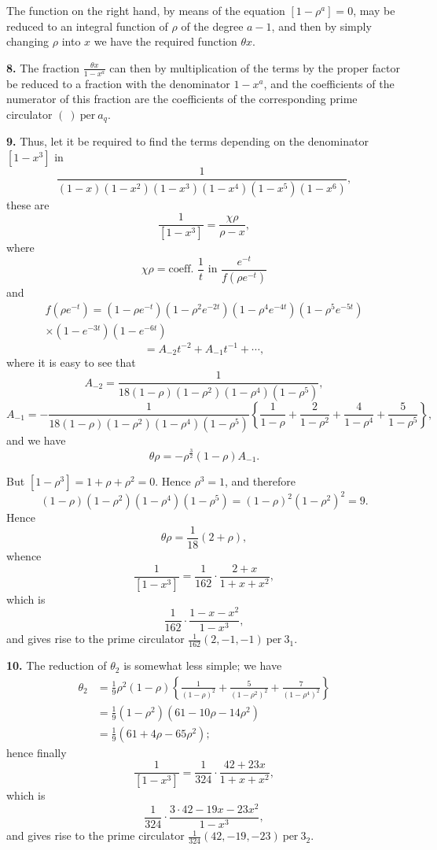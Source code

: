 \documentclass[11pt,a4paper]{book}
\begin{document}
\begin{center}
The function on the right hand, by means of the equation $[1-\rho^a]=0$, may be reduced to an integral function of $\rho$ of the degree $a-1$, and then by simply changing $\rho$ into $x$ we have the required function $\theta x$.

\medskip
\noindent\textbf{8.} The fraction $\frac{\theta x}{1-x^a}$ can then by multiplication of the terms by the proper factor be reduced to a fraction with the denominator $1-x^a$, and the coefficients of the numerator of this fraction are the coefficients of the corresponding prime circulator $(\ )\ \mathrm{per}\ a_q$.

\medskip
\noindent\textbf{9.} Thus, let it be required to find the terms depending on the denominator $[1-x^3]$ in
\[\frac{1}{(1-x)(1-x^2)(1-x^3)(1-x^4)(1-x^5)(1-x^6)},\]
these are
\[\frac{1}{[1-x^3]} = \frac{\chi \rho}{\rho - x},\]
where
\[\chi \rho = \text{coeff. } \frac{1}{t} \text{ in } \frac{e^{-t}}{f(\rho e^{-t})}\]
and
\begin{multline*}
f(\rho e^{-t}) = (1-\rho e^{-t})(1-\rho^2 e^{-2t})(1-\rho^4 e^{-4t})(1-\rho^5 e^{-5t}) \\
\times (1-e^{-3t})(1-e^{-6t})
\end{multline*}
\[= A_{-2}t^{-2} + A_{-1}t^{-1} + \cdots,\]
where it is easy to see that
\[A_{-2} = \frac{1}{18(1-\rho)(1-\rho^2)(1-\rho^4)(1-\rho^5)},\]
\[A_{-1} = -\frac{1}{18(1-\rho)(1-\rho^2)(1-\rho^4)(1-\rho^5)}\left\{\frac{1}{1-\rho}+\frac{2}{1-\rho^2}+\frac{4}{1-\rho^4}+\frac{5}{1-\rho^5}\right\},\]
and we have
\[\theta \rho = -\rho^{\frac{3}{2}}(1-\rho) A_{-1}.\]

But $[1-\rho^3] = 1+\rho+\rho^2 = 0$. Hence $\rho^3=1$, and therefore
\[(1-\rho)(1-\rho^2)(1-\rho^4)(1-\rho^5) = (1-\rho)^2(1-\rho^2)^2 = 9.\]
Hence
\[\theta \rho = \frac{1}{18}(2+\rho),\]
whence
\[\frac{1}{[1-x^3]} = \frac{1}{162} \cdot \frac{2+x}{1+x+x^2},\]
which is
\[\frac{1}{162} \cdot \frac{1-x-x^2}{1-x^3},\]
and gives rise to the prime circulator $\frac{1}{162}(2,-1,-1)\ \mathrm{per}\ 3_1$.

\newpage

\medskip
\noindent\textbf{10.} The reduction of $\theta_2$ is somewhat less simple; we have
\begin{align*}
\theta_2 &= \frac{1}{9}\rho^2(1-\rho)\left\{\frac{1}{(1-\rho)^2} + \frac{5}{(1-\rho^2)^2} + \frac{7}{(1-\rho^4)^2}\right\} \\
&= \frac{1}{9}(1-\rho^2)(61-10\rho-14\rho^2) \\
&= \frac{1}{9}(61+4\rho-65\rho^2);
\end{align*}
hence finally
\[\frac{1}{[1-x^3]} = \frac{1}{324} \cdot \frac{42+23x}{1+x+x^2},\]
which is
\[\frac{1}{324} \cdot \frac{3 \cdot 42 - 19x - 23x^2}{1-x^3},\]
and gives rise to the prime circulator $\frac{1}{324}(42,-19,-23)\ \mathrm{per}\ 3_2$.


\end{center}
\end{document}
